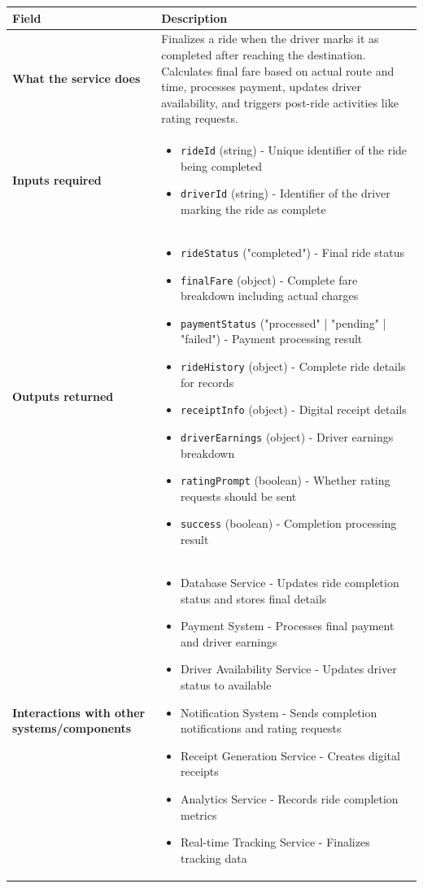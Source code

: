 \documentclass[11pt,a4paper]{article}
\begin{document}
\begin{longtable}{|p{3cm}|p{12cm}|}
\hline
\textbf{Field} & \textbf{Description} \\
\hline
\textbf{What the service does} & 
Finalizes a ride when the driver marks it as completed after reaching the destination. Calculates final fare based on actual route and time, processes payment, updates driver availability, and triggers post-ride activities like rating requests. \\
\hline
\textbf{Inputs required} & 
\begin{itemize}[nosep]
\item \texttt{rideId} (string) - Unique identifier of the ride being completed
\item \texttt{driverId} (string) - Identifier of the driver marking the ride as complete
\end{itemize} \\
\hline
\textbf{Outputs returned} & 
\begin{itemize}[nosep]
\item \texttt{rideStatus} ("completed") - Final ride status
\item \texttt{finalFare} (object) - Complete fare breakdown including actual charges
\item \texttt{paymentStatus} ("processed" | "pending" | "failed") - Payment processing result
\item \texttt{rideHistory} (object) - Complete ride details for records
\item \texttt{receiptInfo} (object) - Digital receipt details
\item \texttt{driverEarnings} (object) - Driver earnings breakdown
\item \texttt{ratingPrompt} (boolean) - Whether rating requests should be sent
\item \texttt{success} (boolean) - Completion processing result
\end{itemize} \\
\hline
\textbf{Interactions with other systems/components} & 
\begin{itemize}[nosep]
\item Database Service - Updates ride completion status and stores final details
\item Payment System - Processes final payment and driver earnings
\item Driver Availability Service - Updates driver status to available
\item Notification System - Sends completion notifications and rating requests
\item Receipt Generation Service - Creates digital receipts
\item Analytics Service - Records ride completion metrics
\item Real-time Tracking Service - Finalizes tracking data
\end{itemize} \\
\hline
\end{longtable}
\end{document}
